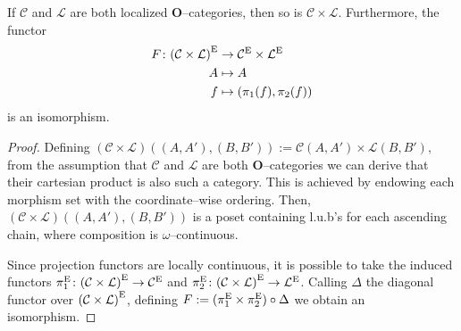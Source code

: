 \begin{prp}\label{iso:prod}
  If \(\mathcal{C}\) and \(\mathcal{L}\) are both localized \(\mathbf{O}\)--categories, then so is \(\mathcal{C} \times \mathcal{L}\).
  Furthermore, the functor
  \begin{equation*}
    \begin{split}
      F \colon {(\mathcal{C} \times \mathcal{L})}^\textup{E} &\to
      \mathcal{C}^\textup{E} \times \mathcal{L}^\textup{E} \\
      A &\mapsto A \\
      f &\mapsto (\pi_1(f), \pi_2(f))
    \end{split}
  \end{equation*}
  is an isomorphism.
\end{prp}
\begin{proof}
  Defining
  \(
  (\mathcal{C} \times \mathcal{L})((A,A'), (B,B')) :=
  \mathcal{C}(A,A') \times \mathcal{L}(B,B'),
  \)
  from the assumption that \(\mathcal{C}\) and \(\mathcal{L}\) are both \(\mathbf{O}\)--categories we can derive that their cartesian product is also such a category. This is achieved by endowing each morphism set with the coordinate--wise ordering. %
  Then, \((\mathcal{C} \times \mathcal{L})((A,A'), (B,B'))\) is a poset containing l.u.b's for each ascending chain, where composition is \(\omega\)--continuous. %

  Since projection functors are locally continuous, it is possible to take the induced functors \(\pi_1^\textup{E} \colon {(\mathcal{C} \times \mathcal{L})}^\textup{E} \to
  \mathcal{C}^\textup{E}\) and \(\pi_2^\textup{E} \colon {(\mathcal{C} \times \mathcal{L})}^\textup{E} \to \mathcal{L}^\textup{E}\). Calling \(\Delta\) the diagonal functor over \({(\mathcal{C} \times \mathcal{L})}^\textup{E}\), defining \(F := (\pi_1^\textup{E} \times \pi_2^\textup{E}) \circ \Delta\) we obtain an isomorphism. %


\end{proof}

